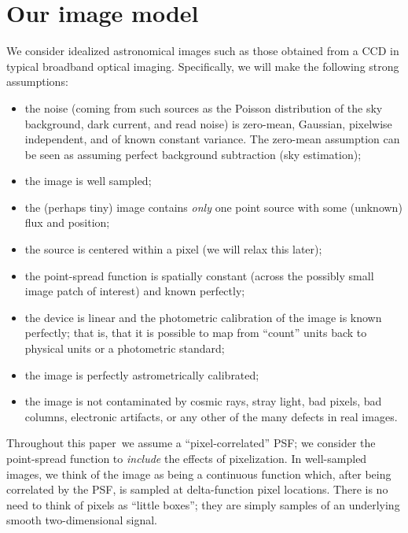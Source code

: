 \documentclass[letterpaper,preprint]{aastex62}
\newcommand{\doctype}{paper}
\begin{document}
\section{Our image model}

We consider idealized astronomical images such as those obtained from
a CCD in typical broadband optical imaging.
Specifically, we will make the following strong assumptions:
\begin{itemize}
\item the noise (coming from such sources as the Poisson distribution
  of the sky background, dark current, and read noise) is zero-mean,
  Gaussian, pixelwise independent, and of known constant variance.  The
  zero-mean assumption can be seen as assuming perfect background
  subtraction (sky estimation);
\item the image is well sampled;
\item the (perhaps tiny) image contains \emph{only} one point
  source with some (unknown) flux and position;
\item the source is centered within a pixel (we will relax this
  later);
\item the point-spread function is spatially constant (across the
  possibly small image patch of interest) and known perfectly;
\item the device is linear and the photometric calibration of the
  image is known perfectly; that is, that it is possible to map from
  ``count'' units back to physical units or a photometric standard;
\item the image is perfectly astrometrically calibrated;
\item the image is not contaminated by cosmic rays, stray light, bad
  pixels, bad columns, electronic artifacts, or any other of the many
  defects in real images.
\end{itemize}

Throughout this \doctype\ we assume a ``pixel-correlated'' PSF; we
consider the point-spread function to \emph{include} the effects of
pixelization.  In well-sampled images, we think of the image as being
a continuous function which, after being correlated by the PSF, is
sampled at delta-function pixel locations.  There is no need to think
of pixels as ``little boxes''; they are simply samples of an
underlying smooth two-dimensional signal.

\end{document}
